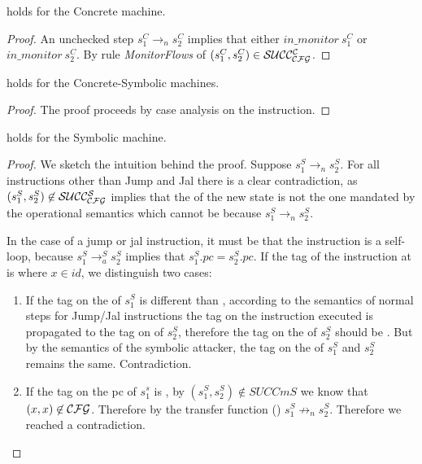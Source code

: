 \begin{lemma}
  \label{cfg_nocheck_CS}
   holds for the Concrete machine.
\end{lemma}
\begin{proof}
  An unchecked step $s^C_1 \to_n s^C_2$ implies
  that either $in\_monitor~s^C_1$ or $in\_monitor~s^C_2$.
  By rule \emph{MonitorFlows} of 
  $(s^C_1,s^C_2) \in \mathcal{SUCC_\mathcal{CFG}^{C}}$.
\end{proof}

\begin{lemma}
  \label{cfg_equiv_CS}
   holds for the Concrete-Symbolic machines.
\end{lemma}
\begin{proof}
  The proof proceeds by case analysis on the instruction.
\end{proof}

\begin{lemma}
  \label{av_no_attacker_S}
   holds for the Symbolic machine.
\end{lemma}
\begin{proof}

  We sketch the intuition behind the proof.  Suppose $s^S_1 \to_n
  s^S_2$. For all instructions other than Jump and Jal there is a
  clear contradiction, as $(s^S_1,s^S_2) \not \in \mathcal{SUCC_\mathcal{CFG}^{S}}$ implies
  that the \pc of the new state is not the one mandated by the
  operational semantics which cannot be because $s^S_1 \to_n
  s^S_2$.

  In the case of a jump or jal instruction, it must be that the
  instruction is a self-loop, because $s^S_1 \to^{S}_a s^S_2$
  implies that $s^S_1.pc = s^S_2.pc$.
  If the tag of the instruction at \pc is  where
  $x \in id$, we distinguish two cases:

  \begin{enumerate}
    \item If the tag on the \pc of $s^S_1$ is different than
      , according to the semantics of normal steps
      for Jump/Jal instructions the tag on the instruction executed
      is propagated to the tag on \pc of $s^S_2$, therefore the tag on
      the \pc of $s^S_2$ should be . But by
      the semantics of the symbolic attacker, the tag on the \pc
      of $s^S_1$ and $s^S_2$ remains the same. Contradiction.
    \item If the tag on the pc of $s^s_1$ is ,
      by $(s^S_1,s^S_2) \not \in SUCCm{S}$ we know that
      $(x,x) \not \in \mathcal{CFG}$. Therefore by the transfer
      function () $s^S_1 \not \to_n s^S_2$.
      Therefore we reached a contradiction.
    \end{enumerate}
\end{proof}


